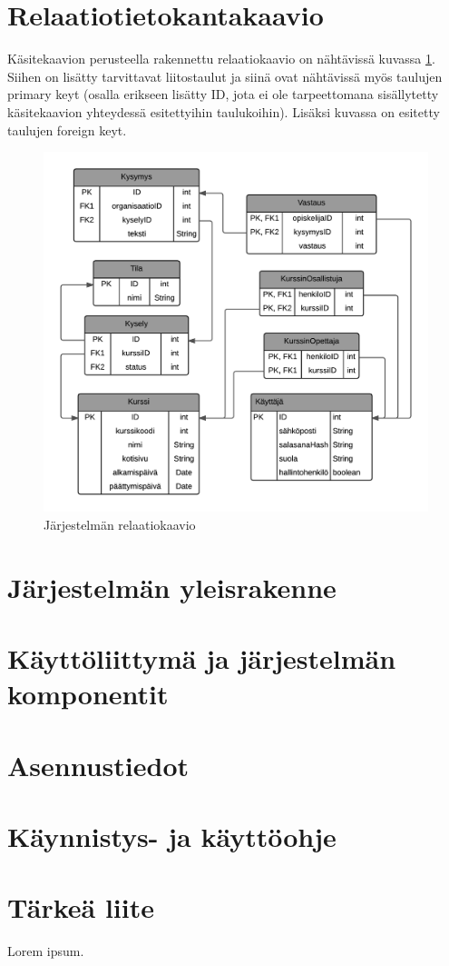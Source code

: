 \documentclass[12pt,a4paper,titlepage]{article}
\begin{document}
\section{Relaatiotietokantakaavio}
Käsitekaavion perusteella rakennettu relaatiokaavio on nähtävissä kuvassa \ref{fig:relaatiokaavio}. Siihen on lisätty tarvittavat liitostaulut ja siinä ovat nähtävissä myös taulujen primary keyt (osalla erikseen lisätty ID, jota ei ole tarpeettomana sisällytetty käsitekaavion yhteydessä esitettyihin taulukoihin). Lisäksi kuvassa on esitetty taulujen foreign keyt.

\begin{figure}
   \centering
   \includegraphics[width=\textwidth]{kuvat/relaatiokaavio-pysty.png}
   \caption{Järjestelmän relaatiokaavio}\label{fig:relaatiokaavio}
\end{figure}

\section{Järjestelmän yleisrakenne}

\section{Käyttöliittymä ja järjestelmän komponentit}

\section{Asennustiedot}

\section{Käynnistys- ja käyttöohje}




\small


\appendix
\section{Tärkeä liite}
Lorem ipsum.
\newpage
\end{document}
